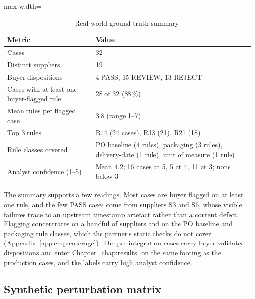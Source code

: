 \begin{table}[htbp]
\centering
\caption{Real world ground-truth summary.}
\label{tab:emp:gtsummary}
\footnotesize
\begin{adjustbox}{max width=\textwidth}
\begin{tabular}{@{}lp{9.5cm}@{}}
\toprule
\textbf{Metric} & \textbf{Value} \\
\midrule
Cases                                            & 32 \\
Distinct suppliers                               & 19 \\
Buyer dispositions                               & 4 PASS, 15 REVIEW, 13 REJECT \\
Cases with at least one buyer-flagged rule       & 28 of 32 (88\,\%) \\
Mean rules per flagged case                      & 3.8 (range 1--7) \\
Top 3 rules                                      & R14 (24 cases), R13 (21), R21 (18) \\
Rule classes covered                             & PO baseline (4 rules), packaging (3 rules), delivery-date (1 rule), unit of measure (1 rule) \\
Analyst confidence (1--5)                        & Mean 4.2; 16 cases at 5, 5 at 4, 11 at 3; none below 3 \\
\bottomrule
\end{tabular}
\end{adjustbox}
\end{table}
The summary supports a few readings. Most cases are buyer flagged on at least one rule, and the few PASS cases come from suppliers S3 and S6, whose visible failures trace to an upstream timestamp artefact rather than a content defect. Flagging concentrates on a handful of suppliers and on the PO baseline and packaging rule classes, which the partner's static checks do not cover (Appendix~\ref{app:emp:coverage}). The pre-integration cases carry buyer validated dispositions and enter Chapter~\ref{chap:results} on the same footing as the production cases, and the labels carry high analyst confidence.


\subsection{Synthetic perturbation matrix}
\label{sec:emp:synthetic}

